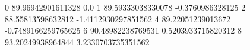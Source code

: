 0 89.96942901611328 0.0
1 89.59333038330078 -0.3760986328125
2 88.55813598632812 -1.4112930297851562
4 89.22051239013672 -0.7489166259765625
6 90.48982238769531 0.5203933715820312
8 93.20249938964844 3.2330703735351562
